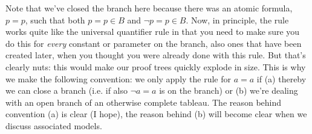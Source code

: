 \begin{enumerate}[\thesection.1]
Note that we've closed the branch here because there was an atomic formula, $p=p$, such that both $p=p\in B$ and $\neg p=p\in B$. Now, in principle, the rule works quite like the universal quantifier rule in that you need to make sure you do this for \emph{every} constant or parameter on the branch, also ones that have been created later, when you thought you were already done with this rule. But that's clearly nuts: this would make our proof trees quickly explode in size. This is why we make the following convention: we only apply the rule for $a=a$ if (a) thereby we can close a branch (i.e. if also $\neg a=a$ is on the branch) or (b) we're dealing with an open branch of an otherwise complete tableau. The reason behind convention (a) is clear (I hope), the reason behind (b) will become clear when we discuss associated models.


\end{enumerate}
